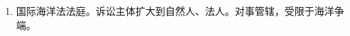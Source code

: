 \begin{enumerate}
\begin{enumerate}
\begin{enumerate}
\begin{enumerate}
\begin{itemize}
                                  \item （本国）专案法官制度。
                                  \item 少数服从多数。
                                \end{itemize}
                        \end{enumerate}
                  \item 国际海洋法法庭。\yi 诉讼主体扩大到自然人、法人。\er 对事管辖，受限于海洋争端。
                \end{enumerate}
        \end{enumerate}
\end{enumerate}
